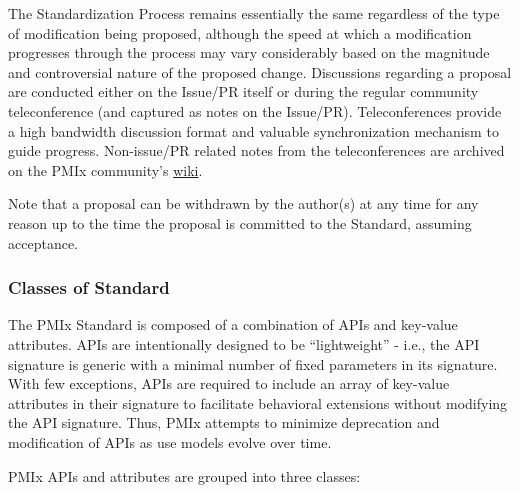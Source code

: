 \documentclass{article}
\begin{document}
The Standardization Process remains essentially the same regardless of
the type of modification being proposed, although the speed at which a
modification progresses through the process may vary considerably based
on the magnitude and controversial nature of the proposed change.
Discussions regarding a proposal are conducted either on the Issue/PR
itself or during the regular community teleconference (and captured as
notes on the Issue/PR). Teleconferences provide a high bandwidth
discussion format and valuable synchronization mechanism to guide
progress. Non-issue/PR related notes from the teleconferences are
archived on the PMIx community's
\href{https://github.com/pmix/pmix-standard/wiki\#meeting-information}{wiki}.

Note that a proposal can be withdrawn by the author(s) at any time for
any reason up to the time the proposal is committed to the Standard,
assuming acceptance.

\hypertarget{classes-of-standard}{%
\subsubsection{Classes of Standard}\label{classes-of-standard}}

The PMIx Standard is composed of a combination of APIs and key-value
attributes. APIs are intentionally designed to be ``lightweight'' -
i.e., the API signature is generic with a minimal number of fixed
parameters in its signature. With few exceptions, APIs are required to
include an array of key-value attributes in their signature to
facilitate behavioral extensions without modifying the API signature.
Thus, PMIx attempts to minimize deprecation and modification of APIs as
use models evolve over time.

PMIx APIs and attributes are grouped into three classes:
\end{document}
